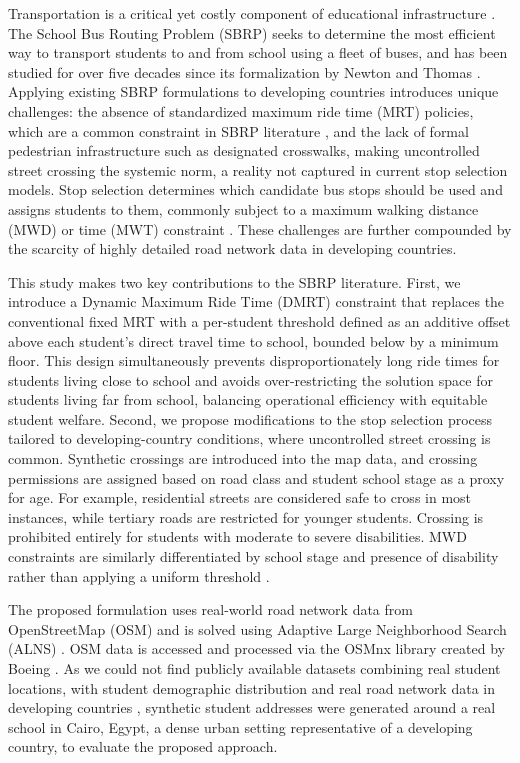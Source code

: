 \documentclass[journal]{IEEEtran}
\begin{document}
Transportation is a critical yet costly component of educational 
infrastructure \cite{c1}. The School Bus Routing Problem (SBRP) seeks 
to determine the most efficient way to transport students to and from 
school using a fleet of buses, and has been studied for over five 
decades since its formalization by Newton and Thomas \cite{c2}. 
Applying existing SBRP formulations to developing countries introduces 
unique challenges: the absence of standardized maximum ride time (MRT) 
policies, which are a common constraint in SBRP literature \cite{c3}, 
and the lack of formal pedestrian infrastructure such as designated 
crosswalks, making uncontrolled street crossing the systemic norm, a 
reality not captured in current stop selection models. Stop 
selection determines which candidate bus stops should be used and 
assigns students to them, commonly subject to a maximum walking 
distance (MWD) or time (MWT) constraint \cite{c5}. These challenges 
are further compounded by the scarcity of highly detailed road network 
data in developing countries.

This study makes two key contributions to the SBRP literature. First, 
we introduce a Dynamic Maximum Ride Time (DMRT) constraint that 
replaces the conventional fixed MRT \cite{c3} with a per-student 
threshold defined as an additive offset above each student's direct 
travel time to school, bounded below by a minimum floor. This design 
simultaneously prevents disproportionately long ride times for 
students living close to school and avoids over-restricting the 
solution space for students living far from school, balancing 
operational efficiency with equitable student welfare. Second, we 
propose modifications to the stop selection process \cite{c6} 
tailored to developing-country conditions, where uncontrolled street 
crossing is common. Synthetic crossings are introduced into the map 
data, and crossing permissions are assigned based on road class and 
student school stage as a proxy for age. For example, 
residential streets are considered safe to cross in most instances, 
while tertiary roads are restricted for younger students. Crossing is 
prohibited entirely for students with moderate to severe disabilities. 
MWD constraints are similarly differentiated by school stage and 
 presence of disability rather than applying a uniform threshold \cite{c1}.

The proposed formulation uses real-world road network data from
OpenStreetMap (OSM) and is solved using Adaptive Large
Neighborhood Search (ALNS) \cite{c9}. OSM data is accessed and
processed via the OSMnx library created by Boeing \cite{c8}. As we could not find publicly available
datasets combining real student locations, with student demographic distribution and real road network data in developing countries \cite{c4}, synthetic student addresses
were generated around a real school in Cairo, Egypt, a dense urban
setting representative of a developing country, to evaluate the
proposed approach.
\end{document}
